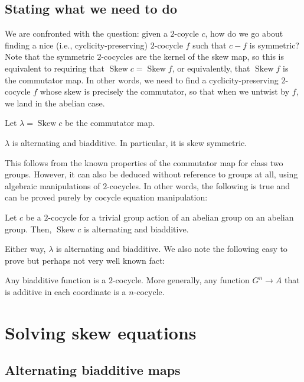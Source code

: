 \documentclass[10pt]{amsart}
\newcommand{\Skew}{\operatorname{Skew}}
\begin{document}
\subsection{Stating what we need to do}

We are confronted with the question: given a $2$-coycle $c$, how do we
go about finding a nice (i.e., cyclicity-preserving) $2$-cocycle $f$
such that $c - f$ is symmetric? Note that the symmetric $2$-cocycles
are the kernel of the skew map, so this is equivalent to requiring
that $\Skew c = \Skew f$, or equivalently, that $\Skew f$ is the
commutator map. In other words, we need to find a cyclicity-preserving
$2$-cocycle $f$ whose skew is precisely the commutator, so that when
we untwist by $f$, we land in the abelian case.

Let $\lambda = \Skew c$ be the commutator map.

\begin{lemma}
  $\lambda$ is alternating and biadditive. In particular, it is skew
  symmetric.  
\end{lemma}

This follows from the known properties of the commutator map for class
two groups. However, it can also be deduced without reference to
groups at all, using algebraic manipulations of $2$-cocycles. In other
words, the following is true and can be proved purely by cocycle
equation manipulation:

\begin{lemma}
  Let $c$ be a $2$-cocycle for a trivial group action of an abelian
  group on an abelian group. Then, $\Skew c$ is alternating and
  biadditive.
\end{lemma}

Either way, $\lambda$ is alternating and biadditive. We also note the
following easy to prove but perhaps not very well known fact:

\begin{lemma}
  Any biadditive function is a $2$-cocycle. More generally, any
  function $G^n \to A$ that is additive in each coordinate is a
  $n$-cocycle.
\end{lemma}

\section{Solving skew equations}

\subsection{Alternating biadditive maps}
\end{document}
